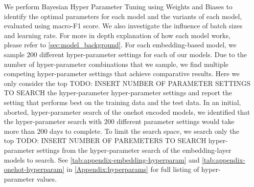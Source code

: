 We perform Bayesian Hyper Parameter Tuning using Weights and Biases \cite{Wandb} to identify the optimal parameters for each model and the variants of each model, evaluated using macro-F1 score. We also investigate the influence of batch sizes and learning rate. For more in depth explanation of how each model works, please refer to \autoref{sec:model_background}.\vspace{5mm}
For each embedding-based model, we sample $200$ different hyper-parameter settings for each of our models. Due to the number of hyper-parameter combinations that we sample, we find multiple competing hyper-parameter settings that achieve comparative results. Here we only consider the top TODO: INSERT NUMBER OF PARAMETER SETTINGS TO SEARCH the hyper-parameter hyper-parameter settings and report the setting that performs best on the training data and the test data. In an initial, aborted, hyper-parameter search of the onehot encoded models, we identified that the hyper-parameter search with $200$ different parameter settings would take more than 200 days to complete.
To limit the search space, we search only the top TODO: INSERT NUMBER OF PAREMETERS TO SEARCH hyper-parameter settings from the hyper-parameter search of the embedding-layer models to search. See \autoref{tab:appendix-embedding-hyperparam} and \autoref{tab:appendix-onehot-hyperparam} in \autoref{Appendix:hyperparams} for full listing of hyper-parameter values.

